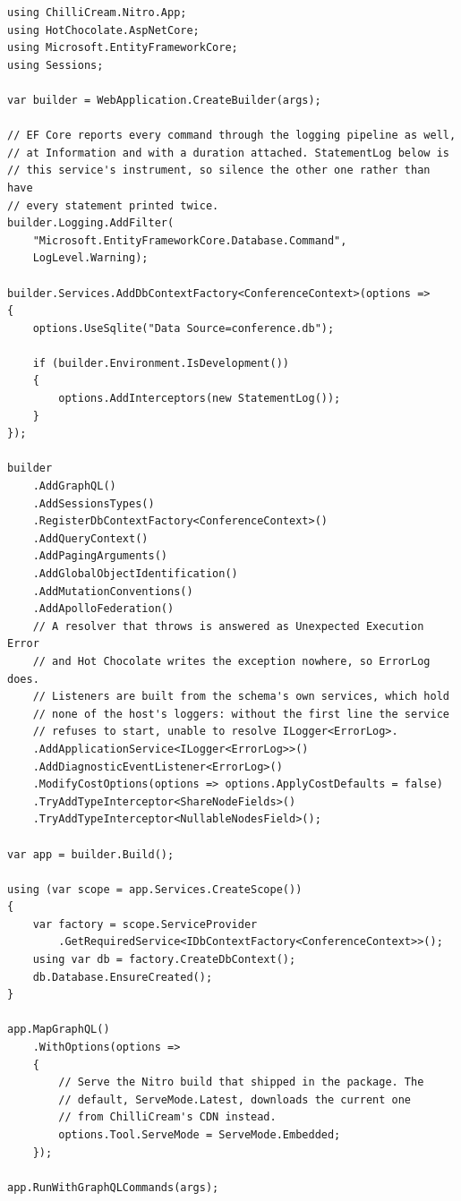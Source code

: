 \begin{verbatim}
using ChilliCream.Nitro.App;
using HotChocolate.AspNetCore;
using Microsoft.EntityFrameworkCore;
using Sessions;

var builder = WebApplication.CreateBuilder(args);

// EF Core reports every command through the logging pipeline as well,
// at Information and with a duration attached. StatementLog below is
// this service's instrument, so silence the other one rather than have
// every statement printed twice.
builder.Logging.AddFilter(
    "Microsoft.EntityFrameworkCore.Database.Command",
    LogLevel.Warning);

builder.Services.AddDbContextFactory<ConferenceContext>(options =>
{
    options.UseSqlite("Data Source=conference.db");

    if (builder.Environment.IsDevelopment())
    {
        options.AddInterceptors(new StatementLog());
    }
});

builder
    .AddGraphQL()
    .AddSessionsTypes()
    .RegisterDbContextFactory<ConferenceContext>()
    .AddQueryContext()
    .AddPagingArguments()
    .AddGlobalObjectIdentification()
    .AddMutationConventions()
    .AddApolloFederation()
    // A resolver that throws is answered as Unexpected Execution Error
    // and Hot Chocolate writes the exception nowhere, so ErrorLog does.
    // Listeners are built from the schema's own services, which hold
    // none of the host's loggers: without the first line the service
    // refuses to start, unable to resolve ILogger<ErrorLog>.
    .AddApplicationService<ILogger<ErrorLog>>()
    .AddDiagnosticEventListener<ErrorLog>()
    .ModifyCostOptions(options => options.ApplyCostDefaults = false)
    .TryAddTypeInterceptor<ShareNodeFields>()
    .TryAddTypeInterceptor<NullableNodesField>();

var app = builder.Build();

using (var scope = app.Services.CreateScope())
{
    var factory = scope.ServiceProvider
        .GetRequiredService<IDbContextFactory<ConferenceContext>>();
    using var db = factory.CreateDbContext();
    db.Database.EnsureCreated();
}

app.MapGraphQL()
    .WithOptions(options =>
    {
        // Serve the Nitro build that shipped in the package. The
        // default, ServeMode.Latest, downloads the current one
        // from ChilliCream's CDN instead.
        options.Tool.ServeMode = ServeMode.Embedded;
    });

app.RunWithGraphQLCommands(args);
\end{verbatim}

